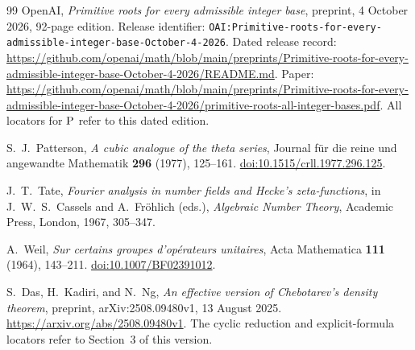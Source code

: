 \documentclass[11pt,a4paper]{article}
\numberwithin{equation}{section}
\theoremstyle{definition}
\theoremstyle{remark}
\newcommand{\Psrc}{\textup{P}}
\begin{document}
\begin{thebibliography}{99}
OpenAI,
\emph{Primitive roots for every admissible integer base},
preprint, 4 October 2026, 92-page edition.
Release identifier:
\nolinkurl{OAI:Primitive-roots-for-every-admissible-integer-base-October-4-2026}.
Dated release record:
\url{https://github.com/openai/math/blob/main/preprints/Primitive-roots-for-every-admissible-integer-base-October-4-2026/README.md}.
Paper:
\url{https://github.com/openai/math/blob/main/preprints/Primitive-roots-for-every-admissible-integer-base-October-4-2026/primitive-roots-all-integer-bases.pdf}.
All locators for $\Psrc$ refer to this dated edition.

S.~J.~Patterson,
\emph{A cubic analogue of the theta series},
Journal f\"ur die reine und angewandte Mathematik
\textbf{296} (1977), 125--161.
\href{https://doi.org/10.1515/crll.1977.296.125}{doi:10.1515/crll.1977.296.125}.

J.~T.~Tate,
\emph{Fourier analysis in number fields and Hecke's zeta-functions},
in J.~W.~S.~Cassels and A.~Fr\"ohlich (eds.),
\emph{Algebraic Number Theory}, Academic Press, London, 1967, 305--347.

A.~Weil,
\emph{Sur certains groupes d'op\'erateurs unitaires},
Acta Mathematica \textbf{111} (1964), 143--211.
\href{https://doi.org/10.1007/BF02391012}{doi:10.1007/BF02391012}.

S.~Das, H.~Kadiri, and N.~Ng,
\emph{An effective version of Chebotarev's density theorem},
preprint, arXiv:2508.09480v1, 13 August 2025.
\url{https://arxiv.org/abs/2508.09480v1}.
The cyclic reduction and explicit-formula locators refer to Section~3
of this version.

\end{thebibliography}
\endgroup
\end{document}
